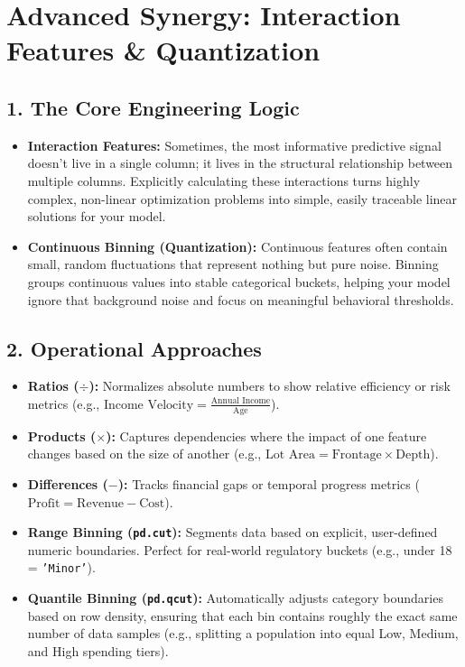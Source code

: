 \documentclass[12pt,a4paper]{article}
\begin{document}
\newpage
\section{Advanced Synergy: Interaction Features \& Quantization}
\subsection*{1. The Core Engineering Logic}
\begin{itemize}
    \item \textbf{Interaction Features:} Sometimes, the most informative predictive signal doesn't live in a single column; it lives in the structural relationship between multiple columns. Explicitly calculating these interactions turns highly complex, non-linear optimization problems into simple, easily traceable linear solutions for your model.
    \item \textbf{Continuous Binning (Quantization):} Continuous features often contain small, random fluctuations that represent nothing but pure noise. Binning groups continuous values into stable categorical buckets, helping your model ignore that background noise and focus on meaningful behavioral thresholds.
\end{itemize}

\subsection*{2. Operational Approaches}
\begin{itemize}
    \item \textbf{Ratios ($\div$):} Normalizes absolute numbers to show relative efficiency or risk metrics (e.g., $\text{Income Velocity} = \frac{\text{Annual Income}}{\text{Age}}$).
    \item \textbf{Products ($\times$):} Captures dependencies where the impact of one feature changes based on the size of another (e.g., $\text{Lot Area} = \text{Frontage} \times \text{Depth}$).
    \item \textbf{Differences ($-$):} Tracks financial gaps or temporal progress metrics ($\text{Profit} = \text{Revenue} - \text{Cost}$).
    \item \textbf{Range Binning (\texttt{pd.cut}):} Segments data based on explicit, user-defined numeric boundaries. Perfect for real-world regulatory buckets (e.g., under 18 = \texttt{'Minor'}).
    \item \textbf{Quantile Binning (\texttt{pd.qcut}):} Automatically adjusts category boundaries based on row density, ensuring that each bin contains roughly the exact same number of data samples (e.g., splitting a population into equal Low, Medium, and High spending tiers).
\end{itemize}
\end{document}
